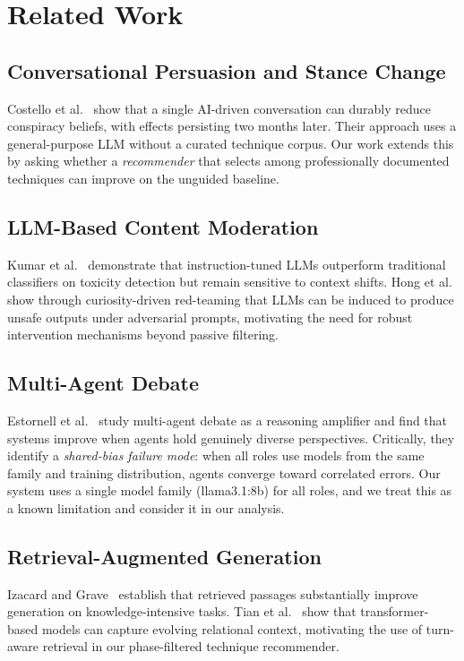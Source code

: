\documentclass[sigconf]{acmart}
\begin{document}
\section{Related Work}

\subsection{Conversational Persuasion and Stance Change}
Costello et al.~\cite{costello2024durably} show that a single AI-driven
conversation can durably reduce conspiracy beliefs, with effects persisting
two months later. Their approach uses a general-purpose LLM without a curated
technique corpus. Our work extends this by asking whether a \emph{recommender}
that selects among professionally documented techniques can improve on the
unguided baseline.

\subsection{LLM-Based Content Moderation}
Kumar et al.~\cite{kumar2023language} demonstrate that instruction-tuned LLMs
outperform traditional classifiers on toxicity detection but remain sensitive
to context shifts. Hong et al.~\cite{hong2024curiosity} show through
curiosity-driven red-teaming that LLMs can be induced to produce unsafe outputs
under adversarial prompts, motivating the need for robust intervention
mechanisms beyond passive filtering.

\subsection{Multi-Agent Debate}
Estornell et al.~\cite{estornell2024scaling} study multi-agent debate as a
reasoning amplifier and find that systems improve when agents hold genuinely
diverse perspectives. Critically, they identify a \emph{shared-bias failure
mode}: when all roles use models from the same family and training distribution,
agents converge toward correlated errors. Our system uses a single model family
(llama3.1:8b) for all roles, and we treat this as a known limitation and
consider it in our analysis.

\subsection{Retrieval-Augmented Generation}
Izacard and Grave~\cite{izacard2022few} establish that retrieved passages
substantially improve generation on knowledge-intensive tasks. Tian et
al.~\cite{tian2023dygformer} show that transformer-based models can capture
evolving relational context, motivating the use of turn-aware retrieval in our
phase-filtered technique recommender.
\end{document}
